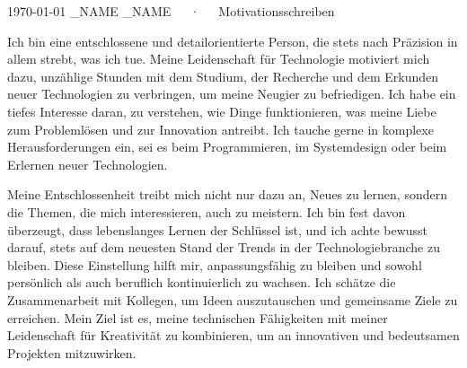 \documentclass[11pt, a4paper]{awesome-cv}
\begin{document}
\makecvheader[R]

\makecvfooter
  {\today}
  {\FIRST_NAME \LAST_NAME~~~·~~~Motivationsschreiben}
  {}

\makelettertitle

\begin{cvletter}
	


Ich bin eine entschlossene und detailorientierte Person, die stets nach Präzision in allem strebt, was ich tue. Meine Leidenschaft für Technologie motiviert mich dazu, unzählige Stunden mit dem Studium, der Recherche und dem Erkunden neuer Technologien zu verbringen, um meine Neugier zu befriedigen. Ich habe ein tiefes Interesse daran, zu verstehen, wie Dinge funktionieren, was meine Liebe zum Problemlösen und zur Innovation antreibt. Ich tauche gerne in komplexe Herausforderungen ein, sei es beim Programmieren, im Systemdesign oder beim Erlernen neuer Technologien.

Meine Entschlossenheit treibt mich nicht nur dazu an, Neues zu lernen, sondern die Themen, die mich interessieren, auch zu meistern. Ich bin fest davon überzeugt, dass lebenslanges Lernen der Schlüssel ist, und ich achte bewusst darauf, stets auf dem neuesten Stand der Trends in der Technologiebranche zu bleiben. Diese Einstellung hilft mir, anpassungsfähig zu bleiben und sowohl persönlich als auch beruflich kontinuierlich zu wachsen. Ich schätze die Zusammenarbeit mit Kollegen, um Ideen auszutauschen und gemeinsame Ziele zu erreichen. Mein Ziel ist es, meine technischen Fähigkeiten mit meiner Leidenschaft für Kreativität zu kombinieren, um an innovativen und bedeutsamen Projekten mitzuwirken.



\end{cvletter}
\end{document}
